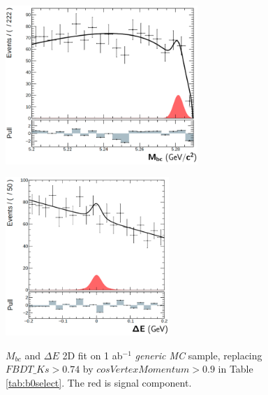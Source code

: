\begin{figure}[htbp]
	\begin{minipage}[b]{0.5\linewidth}
		\centering 
		\includegraphics[height=6cm]{figures/mbcfit_noksdata.png}
		\label{}
	\end{minipage}
	\begin{minipage}[b]{0.5\linewidth}
		\centering 
		\includegraphics[height=6cm]{figures/dEfit_noksdata.png}
		\label{}
	\end{minipage}
	\caption{$M_{bc}$ and $\Delta E$ 2D fit on 1 ab$^{-1}$ \textit{generic MC} sample, replacing $FBDT\_Ks>0.74$ by ${cosVertexMomentum}>0.9$ in Table \ref{tab:b0select}. The red is signal component.}
	\label{fig:2Ddata_noks}
\end{figure}

